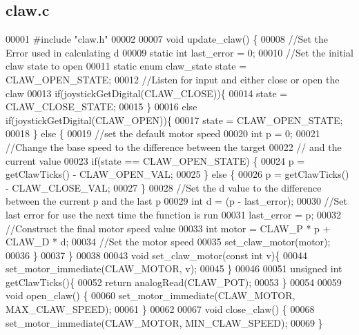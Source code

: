 \subsection{claw.\+c}
\label{claw_8c_source}

\begin{DoxyCode}
00001 \textcolor{preprocessor}{#include "claw.h"}
00002 
00007 \textcolor{keywordtype}{void} update_claw() \{
00008   \textcolor{comment}{//Set the Error used in calculating d}
00009   \textcolor{keyword}{static} \textcolor{keywordtype}{int} last\_error = 0;
00010   \textcolor{comment}{//Set the initial claw state to open}
00011   \textcolor{keyword}{static} \textcolor{keyword}{enum} claw_state state = CLAW_OPEN_STATE;
00012   \textcolor{comment}{//Listen for input and either close or open the claw}
00013   \textcolor{keywordflow}{if}(joystickGetDigital(CLAW_CLOSE))\{
00014     state = CLAW_CLOSE_STATE;
00015   \}
00016   \textcolor{keywordflow}{else} \textcolor{keywordflow}{if}(joystickGetDigital(CLAW_OPEN))\{
00017     state = CLAW_OPEN_STATE;
00018   \} \textcolor{keywordflow}{else} \{
00019     \textcolor{comment}{//set the default motor speed}
00020     \textcolor{keywordtype}{int} p = 0;
00021     \textcolor{comment}{//Change the base speed to the difference between the target}
00022     \textcolor{comment}{// and the current value}
00023     \textcolor{keywordflow}{if}(state == CLAW_OPEN_STATE) \{
00024       p = getClawTicks() - CLAW_OPEN_VAL;
00025     \} \textcolor{keywordflow}{else} \{
00026       p = getClawTicks() - CLAW_CLOSE_VAL;
00027     \}
00028     \textcolor{comment}{//Set the d value to the difference between the current p and the last p}
00029     \textcolor{keywordtype}{int} d = (p - last\_error);
00030     \textcolor{comment}{//Set last error for use the next time the function is run}
00031     last\_error = p;
00032     \textcolor{comment}{//Construct the final motor speed value}
00033     \textcolor{keywordtype}{int} motor = CLAW_P * p + CLAW_D * d;
00034     \textcolor{comment}{//Set the motor speed}
00035     set_claw_motor(motor);
00036   \}
00037 \}
00038 
00043 \textcolor{keywordtype}{void} set_claw_motor(\textcolor{keyword}{const} \textcolor{keywordtype}{int} v)\{
00044   set_motor_immediate(CLAW_MOTOR, v);
00045 \}
00046 
00051 \textcolor{keywordtype}{unsigned} \textcolor{keywordtype}{int} getClawTicks()\{
00052   \textcolor{keywordflow}{return} analogRead(CLAW_POT);
00053 \}
00054 
00059 \textcolor{keywordtype}{void} open_claw() \{
00060   set_motor_immediate(CLAW_MOTOR, MAX_CLAW_SPEED);
00061 \}
00062 
00067 \textcolor{keywordtype}{void} close_claw() \{
00068   set_motor_immediate(CLAW_MOTOR, MIN_CLAW_SPEED);
00069 \}
\end{DoxyCode}
